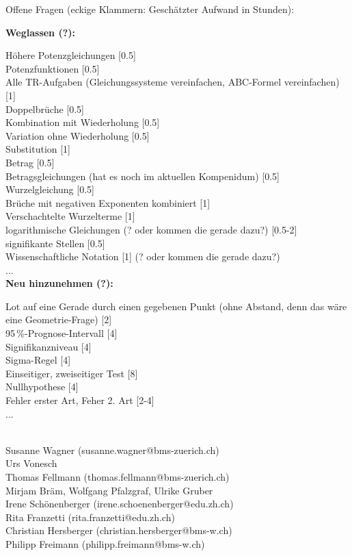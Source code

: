 {Offene Fragen (eckige Klammern: Geschätzter Aufwand in Stunden):

\textbf{Weglassen (?):}

    Höhere Potenzgleichungen [0.5]\\
    Potenzfunktionen [0.5]\\
    Alle TR-Aufgaben (Gleichungssysteme vereinfachen, ABC-Formel vereinfachen) [1]\\
    Doppelbrüche [0.5]\\
    Kombination mit Wiederholung [0.5]\\
    Variation ohne Wiederholung [0.5]\\
    Substitution [1]\\
    Betrag [0.5]\\
    Betragsgleichungen (hat es noch im aktuellen Kompenidum) [0.5]\\
    Wurzelgleichung [0.5]\\
    Brüche mit negativen Exponenten kombiniert [1]\\
    Verschachtelte Wurzelterme [1]\\
    logarithmische Gleichungen (? oder kommen die gerade dazu?) [0.5-2]\\
    signifikante Stellen [0.5]\\
    Wissenschaftliche Notation [1] (? oder kommen die gerade dazu?)\\
    ... \\

\textbf{Neu hinzunehmen (?):}

    Lot auf eine Gerade durch einen gegebenen Punkt (ohne Abstand, denn das wäre eine Geometrie-Frage) [2]\\
    95\,\%-Prognose-Intervall [4]\\
    Signifikanzniveau [4]\\
    Sigma-Regel [4]\\
    Einseitiger, zweiseitiger Test [8]\\
    Nullhypothese [4]\\
    Fehler erster Art, Feher 2. Art [2-4]\\
    ...\\



\vspace{30mm}
\begin{center}\begin{small} \textbf{ }\\
Susanne Wagner (susanne.wagner@bms-zuerich.ch)\\
Urs Vonesch\\
Thomas Fellmann (thomas.fellmann@bms-zuerich.ch)\\
Mirjam Bräm, Wolfgang Pfalzgraf, Ulrike Gruber\\
Irene Schönenberger (irene.schoenenberger@edu.zh.ch)\\
Rita Franzetti (rita.franzetti@edu.zh.ch)\\
Christian Hersberger (christian.hersberger@bms-w.ch)\\
Philipp Freimann (philipp.freimann@bms-w.ch)\\
\vspace{2mm}


\end{small}
\end{center}}
